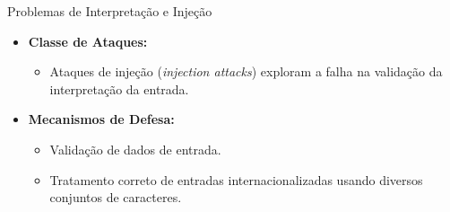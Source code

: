 \begin{frame}{Problemas de Interpretação e Injeção}
    \begin{itemize}
        \item \textbf{Classe de Ataques:}
              \begin{itemize}
                  \item Ataques de injeção (\textit{injection attacks}) exploram a falha na validação da interpretação da entrada.
              \end{itemize}

        \item \textbf{Mecanismos de Defesa:}
              \begin{itemize}
                  \item Validação de dados de entrada.
                  \item Tratamento correto de entradas internacionalizadas usando diversos conjuntos de caracteres.
              \end{itemize}
    \end{itemize}
\end{frame}

